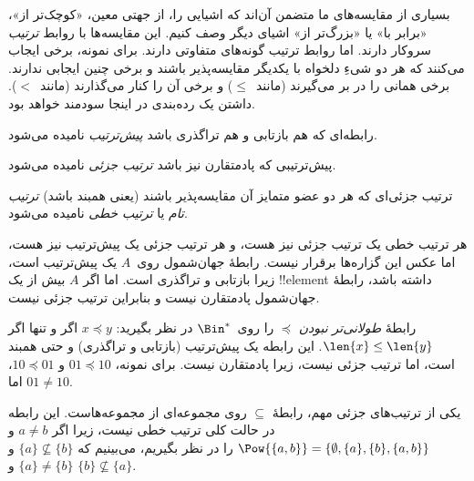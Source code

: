 \documentclass[../../../include/open-logic-section]{subfiles}
\begin{document}

\begin{explain}
بسیاری از مقایسه‌های ما متضمن آن‌اند که اشیایی را، از جهتی معین،
«کوچک‌تر از»، «برابر با» یا «بزرگ‌تر از» اشیای دیگر وصف کنیم. این
مقایسه‌ها با روابط \emph{ترتیب} سروکار دارند. اما روابط ترتیب گونه‌های
متفاوتی دارند. برای نمونه، برخی ایجاب می‌کنند که هر دو شیءِ دلخواه با
یکدیگر مقایسه‌پذیر باشند و برخی چنین ایجابی ندارند. برخی همانی را در بر می‌گیرند
(مانند~$\le$) و برخی آن را کنار می‌گذارند (مانند~$<$). داشتن یک
رده‌بندی در اینجا سودمند خواهد بود.
\end{explain}

\begin{defn}
رابطه‌ای که هم بازتابی و هم تراگذری باشد \emph{پیش‌ترتیب} نامیده
می‌شود.
\end{defn}

\begin{defn}
پیش‌ترتیبی که پادمتقارن نیز باشد \emph{ترتیب جزئی} نامیده می‌شود.
\end{defn}

\begin{defn}
ترتیب جزئی‌ای که هر دو عضو متمایز آن مقایسه‌پذیر باشند (یعنی همبند باشد) \emph{ترتیب تام} یا
\emph{ترتیب خطی} نامیده می‌شود.
\end{defn}

\begin{ex}
هر ترتیب خطی یک ترتیب جزئی نیز هست، و هر ترتیب جزئی یک پیش‌ترتیب نیز
هست، اما عکس این گزاره‌ها برقرار نیست. رابطهٔ جهان‌شمول روی~$A$ یک
پیش‌ترتیب است، زیرا بازتابی و تراگذری است. اما اگر $A$ بیش از یک
!!{element} داشته باشد، رابطهٔ جهان‌شمول پادمتقارن نیست و بنابراین
ترتیب جزئی نیست.
\end{ex}

\begin{ex}
رابطهٔ \emph{طولانی‌تر نبودن} $\preccurlyeq$ را روی~$\Bin^*$ در نظر
بگیرید: $x \preccurlyeq y$ اگر و تنها اگر $\len{x} \le \len{y}$. این
رابطه یک پیش‌ترتیب (بازتابی و تراگذری) و حتی همبند است، اما ترتیب جزئی
نیست، زیرا پادمتقارن نیست. برای نمونه، $01
\preccurlyeq 10$ و $10 \preccurlyeq 01$، اما $01 \neq 10$.
\end{ex}

\begin{ex}
یکی از ترتیب‌های جزئی مهم، رابطهٔ $\subseteq$ روی مجموعه‌ای از
مجموعه‌هاست. این رابطه در حالت کلی ترتیب خطی نیست، زیرا اگر $a \neq b$
و $\Pow{\{a, b\}} = \{\emptyset, \{a\}, \{b\}, \{a,b\}\}$ را در نظر
بگیریم، می‌بینیم که $\{a\} \nsubseteq \{b\}$ و
$\{a\} \neq \{b\}$ و $\{b\}
\nsubseteq \{a\}$.
\end{ex}
\end{document}
